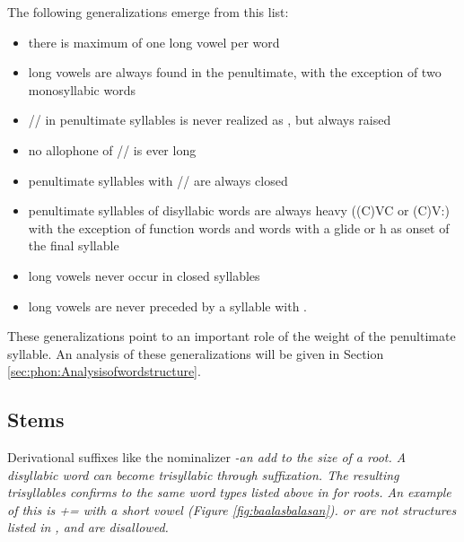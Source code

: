 The following generalizations emerge from this list:
\begin{itemize}
 \item there is maximum of one long vowel per word
 \item long vowels are always found in the penultimate, with the exception of two monosyllabic words
\item /\E/ in penultimate syllables is never realized as , but always raised
\item no allophone of /\E/ is ever long
\item penultimate syllables with /\E/ are always closed
 \item penultimate syllables of disyllabic words are always heavy ((C)VC or (C)V:) with the exception of function words and words with a glide or h as onset of the final syllable
 \item long vowels never occur in closed syllables
 \item long vowels are never preceded by a syllable with .
\end{itemize}

These generalizations point to an important role of the weight of the penultimate syllable. An analysis of these generalizations will be given in Section \ref{sec:phon:Analysisofwordstructure}.

\subsection{Stems}\label{sec:phon:struct:Stems}
Derivational suffixes like the nominalizer \em -an \em add to the size of a root. A disyllabic word can become trisyllabic through suffixation. The resulting trisyllables confirms to the same word types listed above in  for roots.
An example of this is += with a short vowel (Figure \ref{fig:baalasbalasan}).  or  are not structures listed in , and are disallowed.

